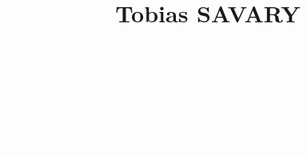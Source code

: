 \documentclass[9pt, oneside, a4paper, titlepage]{extarticle}
\title{Tobias SAVARY}
\date{}
\begin{document}
    
    \begin{tcolorbox}
        \begin{minipage}{0.3\linewidth}
            \hspace*{1cm}
        \end{minipage}%
        \hspace{1cm}%
        \begin{minipage}{0.6\linewidth}
            \begin{center}
                \Huge{\textcolor{white}{Tobias SAVARY}} \\
                \vspace*{0.5cm}
                \Large{\textcolor{white}{Recherche d'un stage de 6 mois \\en tant qu'assistant ingénieur en septembre 2023 \\}}
                \vspace*{0.5cm}
                \Large{\textcolor{white}{\emph{Etudiant en Génie Informatique \\Université de Technologie de Compiègne (UTC) \\}}}
            \end{center}
        \end{minipage}%
    \end{tcolorbox}
\end{document}
